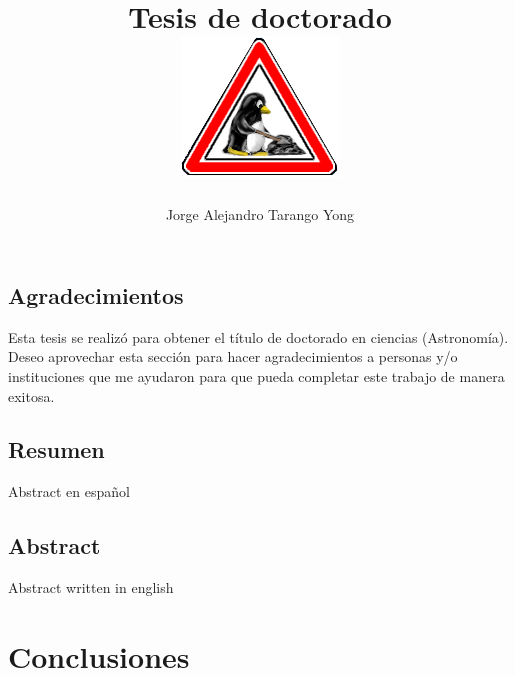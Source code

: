 \documentclass[11pt]{book}
\title{Tesis de doctorado\\
\includegraphics[width=0.1\linewidth]{./Figures/tux-development}
}
\author{Jorge Alejandro Tarango Yong}
\begin{document}
\maketitle
\pagestyle{empty}

\tableofcontents
\newpage
\section*{Agradecimientos}

Esta tesis se realizó para obtener el título de doctorado en 
ciencias (Astronomía). Deseo aprovechar esta sección para hacer
agradecimientos a personas y/o instituciones que me ayudaron para que 
pueda completar este trabajo de manera exitosa.
\newpage
\section*{Resumen}
  Abstract en español

\newpage
\section*{Abstract}
  Abstract written in english

\newpage

  

\pagestyle{fancy}
\fancyhf{}
\fancyhead[L]{\truncate{0.5\headwidth}{\footnotesize \leftmark}}
\fancyhead[R]{\truncate{0.5\headwidth}{\footnotesize \rightmark}}






\chapter{Conclusiones}



\newpage

\end{document}
